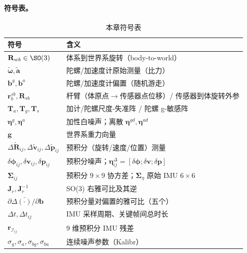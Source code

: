 \paragraph{符号表。}
\begin{table}[H]\centering\small
\caption{本章符号表}
\begin{tabular}{ll}
\toprule
符号 & 含义 \\
\midrule
$\mathbf R_{wb}\in\SO(3)$ & 体系到世界系旋转（body-to-world） \\
$\tilde{\boldsymbol\omega},\tilde{\mathbf a}$ & 陀螺/加速度计原始测量（比力） \\
$\mathbf b^g,\mathbf b^a$ & 陀螺/加速度计偏置（随机游走） \\
$\mathbf r_b^{sb},\mathbf R_{sb}$ & 杆臂（体原点$\to$传感器点位移）/ 传感器到体旋转外参 \\
$\mathbf T_a,\mathbf T_g,\mathbf T_s$ & 加计/陀螺尺度-失准阵 / 陀螺 g-敏感阵 \\
$\boldsymbol\eta^g,\boldsymbol\eta^a$ & 加性白噪声；离散 $\boldsymbol\eta^{gd},\boldsymbol\eta^{ad}$ \\
$\mathbf g$ & 世界系重力向量 \\
$\Delta\tilde{\mathbf R}_{ij},\Delta\tilde{\mathbf v}_{ij},\Delta\tilde{\mathbf p}_{ij}$ & 预积分（旋转/速度/位置）测量 \\
$\delta\boldsymbol\phi_{ij},\delta\mathbf v_{ij},\delta\mathbf p_{ij}$ & 预积分噪声；$\boldsymbol\eta_{ij}^\Delta=[\delta\boldsymbol\phi;\delta\mathbf v;\delta\mathbf p]$ \\
$\boldsymbol\Sigma_{ij}$ & 预积分 $9\times9$ 协方差；$\boldsymbol\Sigma_\eta$ 原始 IMU $6\times6$ \\
$\mathbf J_r,\mathbf J_r^{-1}$ & SO(3) 右雅可比及其逆 \\
$\partial\Delta\bar{(\cdot)}/\partial\mathbf b$ & 预积分量对偏置的雅可比（五个） \\
$\Delta t,\Delta t_{ij}$ & IMU 采样周期、关键帧间总时长 \\
$\mathbf r_{\mathcal I_{ij}}$ & $9$ 维预积分 IMU 残差 \\
$\sigma_g,\sigma_a,\sigma_{bg},\sigma_{ba}$ & 连续噪声参数（Kalibr） \\
\bottomrule
\end{tabular}
\end{table}


